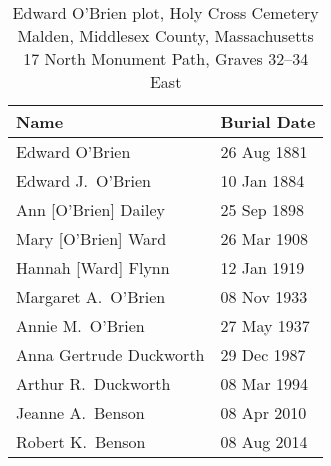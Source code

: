 \begin{table}[ht]
	\centering
	\caption{Edward O'Brien plot, Holy Cross Cemetery\cite{HolyCrossPlotEdward:2} \\
		Malden, Middlesex County, Massachusetts\\
		17 North Monument Path, Graves 32--34 East}
	\begin{tabular}{|l|l|}
		\hline
		\textbf{Name} & \textbf{Burial Date} \\
	\hline
	Edward O'Brien\index{O'Brien!Edward/Edmund\textsuperscript{2}} & 26 Aug 1881 \\
	\hline
	Edward J.\ O'Brien\index{O'Brien!Edward\textsuperscript{3} (1861--1884)} & 10 Jan 1884 \\
	\hline
	Ann [O'Brien] Dailey\index{O'Brien!Ann\textsuperscript{2}}\index{Dailey!Ann\textsuperscript{2} (O'Brien)} & 25 Sep 1898 \\
	\hline
	Mary [O'Brien] Ward\index{O'Brien!Mary\textsuperscript{2}}\index{Ward!Mary\textsuperscript{2} (O'Brien)} & 26 Mar 1908 \\
	\hline
	Hannah [Ward] Flynn\index{Ward!Hannah/Hanora\textsuperscript{3}}\index{Flynn!Hannah/Hanora\textsuperscript{3} (Ward)} & 12 Jan 1919 \\
	\hline
	Margaret A.\ O'Brien\index{O'Brien!Margaret A.\textsuperscript{3} (1859--1933)} & 08 Nov 1933 \\
	\hline
	Annie M.\ O'Brien\index{O'Brien!Ann\textsuperscript{3}} & 27 May 1937 \\
	\hline
	Anna Gertrude Duckworth\index{Duckworth!Anna Gertrude} & 29 Dec 1987 \\
	\hline
	Arthur R.\ Duckworth\index{Duckworth!Arthur R.} & 08 Mar 1994 \\
	\hline
	Jeanne A.\ Benson\index{Benson!Jeanne A.} & 08 Apr 2010 \\
	\hline
	Robert K.\ Benson\index{Benson!Robert K.} & 08 Aug 2014 \\
	\hline
	\end{tabular}
\end{table}

